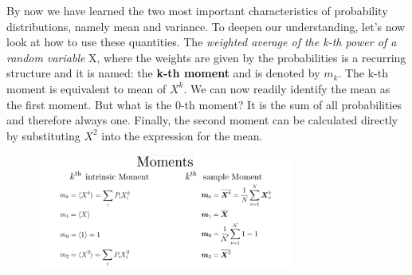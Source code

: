\documentclass[12pt, a4paper]{scrartcl}
\begin{document}
By now we have learned the two most important characteristics of probability distributions, namely mean and variance.
To deepen our understanding, let's now look at how to use these quantities.
The \textit{weighted average of the k-th power of a random variable }X, where the weights are given by the probabilities is a recurring structure and it is named: the \textbf{k-th moment} and is denoted by $m_k$.
The k-th moment is equivalent to mean of $X^k$.
We can now readily identify the mean as the first moment. 
But what is the 0-th moment? It is the sum of all probabilities and therefore always one.
Finally, the second moment can be calculated directly by substituting $X^2$ into the expression for the mean.\\
\begin{figure}[H]
	\centering
	\includegraphics[width=0.75\textwidth]{2_8.png}
\end{figure}

\\
\end{document}
